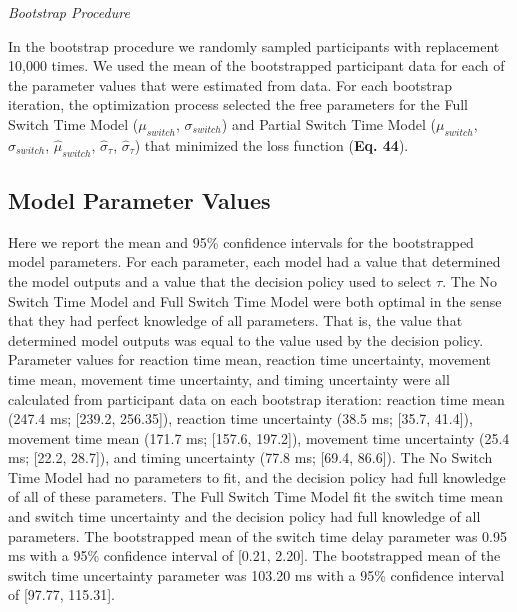 \documentclass[man,floatsintext,letterpaper,12pt]{apa7}
\newcommand\boldblue[1]{\textcolor{mydarkblue}{\textbf{#1}}}
\begin{document}
\vspace{2mm}
\noindent\emph{Bootstrap Procedure}

\noindent In the bootstrap procedure we randomly sampled participants with replacement 10,000 times\autocite{cashabackGradientReinforcementLandscape2019a, cashabackDissociatingErrorbasedReinforcementbased2017,rothReinforcementbasedProcessesActively2023,rothPunishmentLeadsGreater2024}. We used the mean of the bootstrapped participant data for each of the parameter values that were estimated from data. For each bootstrap iteration, the optimization process selected the free parameters for the Full Switch Time Model ($\mu_{switch}$, $\sigma_{switch}$) and Partial Switch Time Model ($\mu_{switch}$, $\sigma_{switch}$, $\hat{\mu}_{switch}$, $\hat{\sigma}_{\tau}$, $\hat{\sigma}_{\tau}$) that minimized the loss function (\boldblue{Eq. 44}).

\vspace{2mm}
\subsection{Model Parameter Values}

\noindent Here we report the mean and 95\% confidence intervals for the bootstrapped model parameters. For each parameter, each model had a value that determined the model outputs and a value that the decision policy used to select $\tau$. The No Switch Time Model and Full Switch Time Model were both optimal in the sense that they had perfect knowledge of all parameters. That is, the value that determined model outputs was equal to the value used by the decision policy. Parameter values for reaction time mean, reaction time uncertainty, movement time mean, movement time uncertainty, and timing uncertainty were all calculated from participant data on each bootstrap iteration: reaction time mean (247.4 ms; [239.2, 256.35]), reaction time uncertainty (38.5 ms; [35.7, 41.4]), movement time mean (171.7 ms; [157.6, 197.2]), movement time uncertainty (25.4 ms; [22.2, 28.7]), and timing uncertainty (77.8 ms; [69.4, 86.6]). The No Switch Time Model had no parameters to fit, and the decision policy had full knowledge of all of these parameters. The Full Switch Time Model fit the switch time mean and switch time uncertainty and the decision policy had full knowledge of all parameters. The bootstrapped mean of the switch time delay parameter was 0.95 ms with a 95\% confidence interval of [0.21, 2.20]. The bootstrapped mean of the switch time uncertainty parameter was 103.20 ms with a 95\% confidence interval of [97.77, 115.31].
\end{document}
